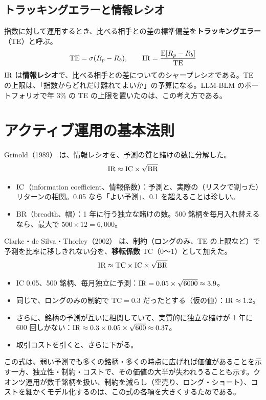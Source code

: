 \subsection{トラッキングエラーと情報レシオ}

指数に対して運用するとき、比べる相手との差の標準偏差を\textbf{トラッキングエラー}（TE）と呼ぶ。
\begin{equation}
\mathrm{TE} = \sigma(R_p - R_b), \qquad \mathrm{IR} = \frac{\mathrm{E}[R_p - R_b]}{\mathrm{TE}}
\end{equation}
$\mathrm{IR}$ は\textbf{情報レシオ}で、比べる相手との差についてのシャープレシオである。TE の上限は、「指数からどれだけ離れてよいか」の予算になる。LLM-BLM のポートフォリオで年 3\% の TE の上限を置いたのは、この考え方である。

\section{アクティブ運用の基本法則}
\label{sec:flam}

Grinold（1989）\cite{grinold1989} は、情報レシオを、予測の質と賭けの数に分解した。
\begin{equation}
\mathrm{IR} \approx \mathrm{IC} \times \sqrt{\mathrm{BR}}
\label{eq:flam}
\end{equation}
\begin{itemize}
\item $\mathrm{IC}$（information coefficient、情報係数）：予測と、実際の（リスクで割った）リターンの相関。0.05 なら「よい予測」、0.1 を超えることは珍しい。
\item $\mathrm{BR}$（breadth、幅）：1 年に行う独立な賭けの数。500 銘柄を毎月入れ替えるなら、最大で $500 \times 12 = 6{,}000$。
\end{itemize}

Clarke・de Silva・Thorley（2002）\cite{cdt2002} は、制約（ロングのみ、TE の上限など）で予測を比率に移しきれない分を、\textbf{移転係数} $\mathrm{TC}$（0〜1）として加えた。
\begin{equation}
\mathrm{IR} \approx \mathrm{TC} \times \mathrm{IC} \times \sqrt{\mathrm{BR}}
\end{equation}

\begin{exbox}[基本法則で考える]
\begin{itemize}
\item IC 0.05、500 銘柄、毎月独立に予測：$\mathrm{IR} = 0.05 \times \sqrt{6000} \approx 3.9$。
\item 同じで、ロングのみの制約で $\mathrm{TC} = 0.3$ だったとする（仮の値）：$\mathrm{IR} \approx 1.2$。
\item さらに、銘柄の予測が互いに相関していて、実質的に独立な賭けが 1 年に 600 回しかない：$\mathrm{IR} \approx 0.3 \times 0.05 \times \sqrt{600} \approx 0.37$。
\item 取引コストを引くと、さらに下がる。
\end{itemize}
この式は、弱い予測でも多くの銘柄・多くの時点に広げれば価値があることを示す一方、独立性・制約・コストで、その価値の大半が失われうることも示す。クオンツ運用が数千銘柄を扱い、制約を減らし（空売り、ロング・ショート）、コストを細かくモデル化するのは、この式の各項を大きくするためである。
\end{exbox}


